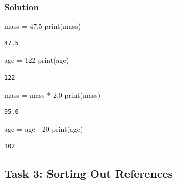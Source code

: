 \documentclass[
  letterpaper,
  DIV=11,
  numbers=noendperiod]{scrartcl}
\newenvironment{Shaded}{\begin{snugshade}}{\end{snugshade}}
\newcommand{\BuiltInTok}[1]{\textcolor[rgb]{0.00,0.23,0.31}{#1}}
\newcommand{\DecValTok}[1]{\textcolor[rgb]{0.68,0.00,0.00}{#1}}
\newcommand{\FloatTok}[1]{\textcolor[rgb]{0.68,0.00,0.00}{#1}}
\newcommand{\NormalTok}[1]{\textcolor[rgb]{0.00,0.23,0.31}{#1}}
\newcommand{\OperatorTok}[1]{\textcolor[rgb]{0.37,0.37,0.37}{#1}}
\begin{document}
\subsubsection{Solution}

\begin{Shaded}
\begin{Highlighting}[]
\NormalTok{mass }\OperatorTok{=} \FloatTok{47.5}
\BuiltInTok{print}\NormalTok{(mass)}
\end{Highlighting}
\end{Shaded}

\begin{verbatim}
47.5
\end{verbatim}

\begin{Shaded}
\begin{Highlighting}[]
\NormalTok{age }\OperatorTok{=} \DecValTok{122}
\BuiltInTok{print}\NormalTok{(age)}
\end{Highlighting}
\end{Shaded}

\begin{verbatim}
122
\end{verbatim}

\begin{Shaded}
\begin{Highlighting}[]
\NormalTok{mass }\OperatorTok{=}\NormalTok{ mass }\OperatorTok{*} \FloatTok{2.0}
\BuiltInTok{print}\NormalTok{(mass)}
\end{Highlighting}
\end{Shaded}

\begin{verbatim}
95.0
\end{verbatim}

\begin{Shaded}
\begin{Highlighting}[]
\NormalTok{age }\OperatorTok{=}\NormalTok{ age }\OperatorTok{{-}} \DecValTok{20}
\BuiltInTok{print}\NormalTok{(age)}
\end{Highlighting}
\end{Shaded}

\begin{verbatim}
102
\end{verbatim}

\subsection{Task 3: Sorting Out
References}\label{task-3-sorting-out-references}
\end{document}
